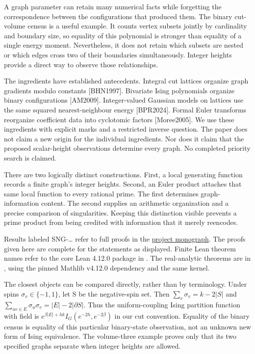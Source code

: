 \documentclass[
  11pt,
  a4paper,
]{article}
\let\singularitytexttt\texttt
\renewcommand{\texttt}[1]{\singularitytexttt{\seqsplit{#1}}}
\begin{document}
A graph parameter can retain many numerical facts while forgetting the
correspondence between the configurations that produced them. The binary
cut-volume census is a useful example. It counts vertex subsets jointly
by cardinality and boundary size, so equality of this polynomial is
stronger than equality of a single energy moment. Nevertheless, it does
not retain which subsets are nested or which edges cross two of their
boundaries simultaneously. Integer heights provide a direct way to
observe those relationships.

The ingredients have established antecedents. Integral cut lattices
organize graph gradients modulo constants {[}BHN1997{]}. Bivariate Ising
polynomials organize binary configurations {[}AM2009{]}. Integer-valued
Gaussian models on lattices use the same squared nearest-neighbour
energy {[}BPR2024{]}. Formal Euler transforms reorganize coefficient
data into cyclotomic factors {[}Moree2005{]}. We use these ingredients
with explicit marks and a restricted inverse question. The paper does
not claim a new origin for the individual ingredients. Nor does it claim
that the proposed scalar-height observations determine every graph. No
completed priority search is claimed.

There are two logically distinct constructions. First, a local
generating function records a finite graph's integer heights. Second, an
Euler product attaches that same local function to every rational prime.
The first determines graph-information content. The second supplies an
arithmetic organization and a precise comparison of singularities.
Keeping this distinction visible prevents a prime product from being
credited with information that it merely reencodes.

Results labeled SNG-\ldots{} refer to full proofs in the
\href{../MONOGRAPH.md}{project monograph}. The proofs given here are
complete for the statements as displayed. Finite Lean theorem names
refer to the core Lean 4.12.0 package in \texttt{formal/}. The
real-analytic theorems are in \texttt{formal-analysis/}, using the
pinned Mathlib v4.12.0 dependency and the same kernel.

The closest objects can be compared directly, rather than by
terminology. Under spins \(\sigma_v\in\{-1,1\}\), let S be the
negative-spin set. Then \(\sum_v\sigma_v=k-2|S|\) and
\(\sum_{uv\in E}\sigma_u\sigma_v=|E|-2|\partial S|\). Thus the
uniform-coupling Ising partition function with field is
\(e^{\beta|E|+hk}I_G(e^{-2h},e^{-2\beta})\) in our cut convention.
Equality of the binary census is equality of this particular
binary-state observation, not an unknown new form of Ising equivalence.
The volume-three example proves only that its two specified graphs
separate when integer heights are allowed.
\end{document}
